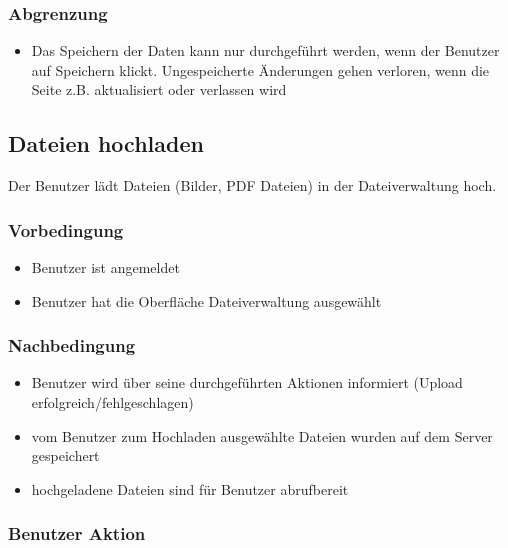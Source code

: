 \documentclass[a4paper,12pt]{article}
\begin{document}
\subsubsection{Abgrenzung}\label{abgrenzung-10}

\begin{itemize}

\item
  Das Speichern der Daten kann nur durchgeführt werden, wenn der
  Benutzer auf Speichern klickt. Ungespeicherte Änderungen gehen
  verloren, wenn die Seite z.B. aktualisiert oder verlassen wird
\end{itemize}

\clearpage

\subsection{Dateien hochladen}\label{dateien-hochladen-produkt-kunden--bilderpdfs}
Der Benutzer lädt Dateien (Bilder, PDF Dateien) in der Dateiverwaltung hoch.

\subsubsection{Vorbedingung}\label{vorbedingung-11}

\begin{itemize}

\item
  Benutzer ist angemeldet
\item
  Benutzer hat die Oberfläche Dateiverwaltung ausgewählt
\end{itemize}

\subsubsection{Nachbedingung}\label{nachbedingung-11}

\begin{itemize}

\item
  Benutzer wird über seine durchgeführten Aktionen informiert (Upload
  erfolgreich/fehlgeschlagen)
\item
  vom Benutzer zum Hochladen ausgewählte Dateien wurden auf dem Server
  gespeichert
\item
  hochgeladene Dateien sind für Benutzer abrufbereit
\end{itemize}

\subsubsection{Benutzer Aktion}\label{benutzer-aktion-11}
\end{document}
